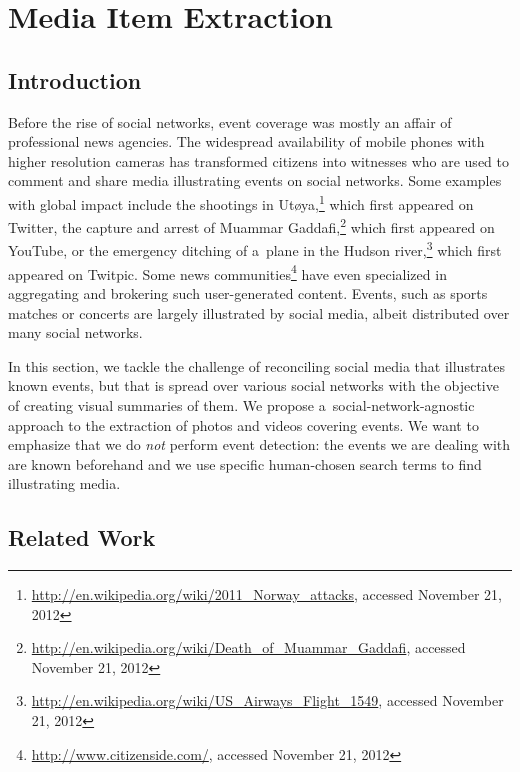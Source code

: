 \chapter{Media Item Extraction}
\label{cha:media-item-extraction}

\ifpdf
    \graphicspath{{5_media_item_extraction/figures/PNG/}{5_media_item_extraction/figures/PDF/}{5_media_item_extraction/figures/}}
\else
    \graphicspath{{5_media_item_extraction/figures/EPS/}{5_media_item_extraction/figures/}}
\fi

\section{Introduction}

Before the rise of social networks,
event coverage was mostly an affair of professional news agencies.
The widespread availability of mobile phones
with higher resolution cameras has transformed
citizens into witnesses who are used to comment
and share media illustrating events on social networks.
Some examples with global impact
include the shootings in
Ut{\o}ya,\footnote{\url{http://en.wikipedia.org/wiki/2011_Norway_attacks},
accessed November 21, 2012}
which first appeared on Twitter,
the capture and arrest of Muammar
Gaddafi,\footnote{\url{http://en.wikipedia.org/wiki/Death_of_Muammar_Gaddafi},
accessed November 21, 2012}
which first appeared on YouTube,
or the emergency ditching of a~plane in the Hudson
river,\footnote{\url{http://en.wikipedia.org/wiki/US_Airways_Flight_1549},
accessed November 21, 2012}
which first appeared on Twitpic.
Some news
communities\footnote{\url{http://www.citizenside.com/},
accessed November 21, 2012}
have even specialized in aggregating and brokering
such user-generated content.
Events, such as sports matches or concerts are 
largely illustrated by social media,
albeit distributed over many social networks.

In this section, we tackle the challenge of reconciling
social media that illustrates known events,
but that is spread over various social networks
with the objective of creating visual summaries of them.
We propose a~social-network-agnostic
approach to the extraction of photos and videos covering events.
We want to emphasize that we do \emph{not} perform event detection: 
the events we are dealing with are known beforehand
and we use specific human-chosen search terms
to find illustrating media.

\section{Related Work}

